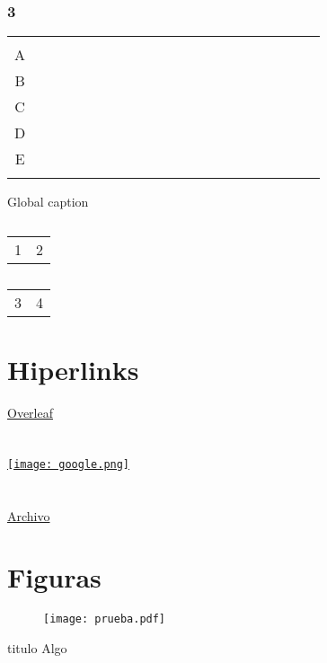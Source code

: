 \begin{table}[H]
{\begin{minipage}{\linewidth}
			\subsubsection{3}
			\begin{tabular}{*{21}{C|}}
				 & \mc{} & \mc{} & \mc{} &  \mc{} &  & \mc{} & \mc{} & \mc{} &  \mc{} &  & \mc{} & \mc{} & \mc{} &  \mc{} &  & \mc{} & \mc{} & \mc{} &  \mc{} &  \tabularnewline {}
				A   & & & &  &  & & & & & & & & &  & & & & & &  \tabularnewline {}
				B   & & & &  &  & & & & & & & & &  & & & & & &  \tabularnewline {}
				C   & & & &  &  & & & & & & & & &  & & & & & &  \tabularnewline {}
				D   & & & &  &  & & & & & & & & &  & & & & & &  \tabularnewline {}
				E  & & & &  &  & & & & & & & & &  & & & & & &  \tabularnewline {}
			\end{tabular}
	\end{minipage}}
\end{table}

\begin{table}[!htb]
	\caption{Global caption}
	\begin{minipage}{.5\linewidth}
		\caption{}
		\centering
		\begin{tabular}{ll}
			1 & 2
		\end{tabular}
	\end{minipage}%
	\begin{minipage}{.5\linewidth}
		\centering
		\caption{}
		\begin{tabular}{ll}
			3 & 4
		\end{tabular}
	\end{minipage} 
\end{table}

\section{Hiperlinks}
\href{https://www.overleaf.com}{Overleaf}\\\\\\
\href{http://www.google.com.ar}{\texttt{[image: google.png]}}\\\\\\
\href{run:Documents/prueba.pdf}{Archivo}
\section{Figuras}
\begin{figure}[H]
\centering
\texttt{[image: prueba.pdf]}
\end{figure}
\begin{mybox}{titulo}
  Algo
\end{mybox}
